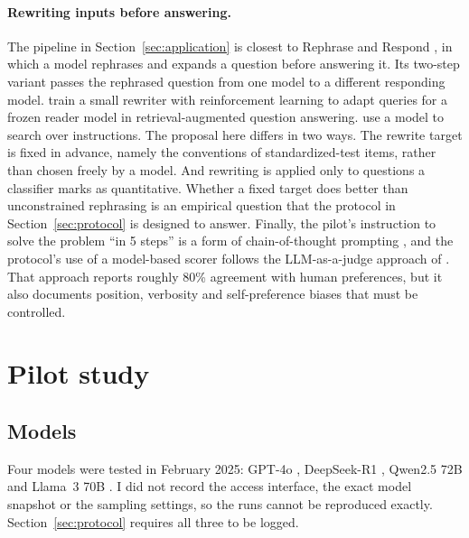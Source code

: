 \documentclass[11pt]{article}
\begin{document}
\paragraph{Rewriting inputs before answering.}
The pipeline in Section~\ref{sec:application} is closest to Rephrase and Respond \citep{deng2023rephrase}, in which a model rephrases and expands a question before answering it. Its two-step variant passes the rephrased question from one model to a different responding model. \citet{ma2023query} train a small rewriter with reinforcement learning to adapt queries for a frozen reader model in retrieval-augmented question answering. \citet{zhou2023ape} use a model to search over instructions. The proposal here differs in two ways. The rewrite target is fixed in advance, namely the conventions of standardized-test items, rather than chosen freely by a model. And rewriting is applied only to questions a classifier marks as quantitative. Whether a fixed target does better than unconstrained rephrasing is an empirical question that the protocol in Section~\ref{sec:protocol} is designed to answer. Finally, the pilot's instruction to solve the problem ``in 5 steps'' is a form of chain-of-thought prompting \citep{wei2022cot}, and the protocol's use of a model-based scorer follows the LLM-as-a-judge approach of \citet{zheng2023judging}. That approach reports roughly 80\% agreement with human preferences, but it also documents position, verbosity and self-preference biases that must be controlled.

\section{Pilot study}
\label{sec:method}

\subsection{Models}
Four models were tested in February 2025: GPT-4o \citep{openai2024gpt4o}, DeepSeek-R1 \citep{deepseek2025r1}, Qwen2.5 72B \citep{qwen2024qwen25} and Llama~3 70B \citep{grattafiori2024llama3}. I did not record the access interface, the exact model snapshot or the sampling settings, so the runs cannot be reproduced exactly. Section~\ref{sec:protocol} requires all three to be logged.
\end{document}
